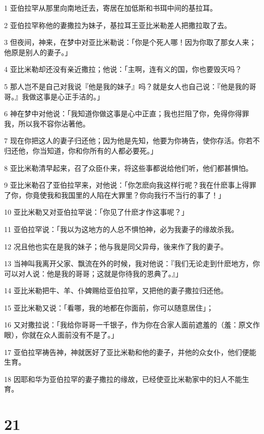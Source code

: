 \par 1 亚伯拉罕从那里向南地迁去，寄居在加低斯和书珥中间的基拉耳。
\par 2 亚伯拉罕称他的妻撒拉为妹子，基拉耳王亚比米勒差人把撒拉取了去。
\par 3 但夜间，神来，在梦中对亚比米勒说：「你是个死人哪！因为你取了那女人来；他原是别人的妻子。」
\par 4 亚比米勒却还没有亲近撒拉；他说：「主啊，连有义的国，你也要毁灭吗？
\par 5 那人岂不是自己对我说『他是我的妹子』吗？就是女人也自己说：『他是我的哥哥。』我做这事是心正手洁的。」
\par 6 神在梦中对他说：「我知道你做这事是心中正直；我也拦阻了你，免得你得罪我，所以我不容你沾著他。
\par 7 现在你把这人的妻子归还他；因为他是先知，他要为你祷告，使你存活。你若不归还他，你当知道，你和你所有的人都必要死。」
\par 8 亚比米勒清早起来，召了众臣仆来，将这些事都说给他们听，他们都甚惧怕。
\par 9 亚比米勒召了亚伯拉罕来，对他说：「你怎麽向我这样行呢？我在什麽事上得罪了你，你竟使我和我国里的人陷在大罪里？你向我行不当行的事了！」
\par 10 亚比米勒又对亚伯拉罕说：「你见了什麽才作这事呢？」
\par 11 亚伯拉罕说：「我以为这地方的人总不惧怕神，必为我妻子的缘故杀我。
\par 12 况且他也实在是我的妹子；他与我是同父异母，後来作了我的妻子。
\par 13 当神叫我离开父家、飘流在外的时候，我对他说：『我们无论走到什麽地方，你可以对人说：他是我的哥哥；这就是你待我的恩典了。』」
\par 14 亚比米勒把牛、羊、仆婢赐给亚伯拉罕，又把他的妻子撒拉归还他。
\par 15 亚比米勒又说：「看哪，我的地都在你面前，你可以随意居住」；
\par 16 又对撒拉说：「我给你哥哥一千银子，作为你在合家人面前遮羞的（羞：原文作眼），你就在众人面前没有不是了。」
\par 17 亚伯拉罕祷告神，神就医好了亚比米勒和他的妻子，并他的众女仆，他们便能生育。
\par 18 因耶和华为亚伯拉罕的妻子撒拉的缘故，已经使亚比米勒家中的妇人不能生育。

\chapter{21}

